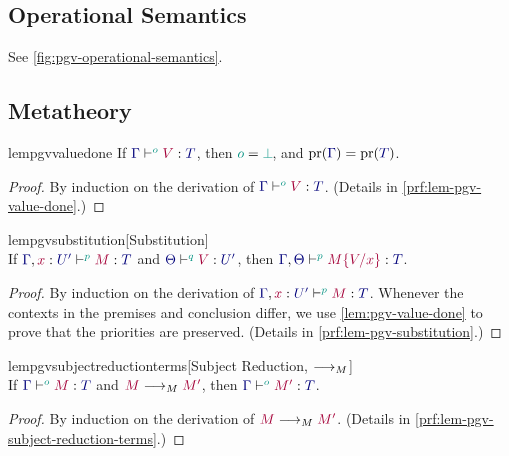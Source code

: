 \documentclass[main.tex]{subfiles}
\begin{document}
\subsection{Operational Semantics}
See \cref{fig:pgv-operational-semantics}.


\subsection{Metatheory}

\begin{restatablelemma}{lempgvvaluedone}
  \label{lem:pgv-value-done}
  If $\tseq[\cs{o}]{\ty{\Gamma}}{V}{T}$, then $\cs{o}=\cs{\pbot}$, and $\pr(\ty{\Gamma})=\pr(\ty{T})$.
\end{restatablelemma}
\begin{proof}
  By induction on the derivation of $\tseq[\cs{o}]{\ty{\Gamma}}{V}{T}$.
  (Details in \cref{prf:lem-pgv-value-done}.)
\end{proof}

\begin{restatablelemma}{lempgvsubstitution}[Substitution]
  \label{lem:pgv-substitution}
  \hfill\\%
  If $\tseq[\cs{p}]{\ty{\Gamma},\tmty{x}{U'}}{M}{T}$ and $\tseq[\cs{q}]{\ty{\Theta}}{V}{U'}$, then $\tseq[\cs{p}]{\ty{\Gamma},\ty{\Theta}}{\subst{M}{V}{x}}{T}$.
\end{restatablelemma}
\begin{proof}
  By induction on the derivation of $\tseq[\cs{p}]{\ty{\Gamma},\tmty{x}{U'}}{M}{T}$. Whenever the contexts in the premises and conclusion differ, we use \cref{lem:pgv-value-done} to prove that the priorities are preserved.
  (Details in \cref{prf:lem-pgv-substitution}.)
\end{proof}

\begin{restatablelemma}{lempgvsubjectreductionterms}[Subject Reduction, $\longrightarrow_{M}$]
  \label{lem:pgv-subject-reduction-terms}
  \hfill\\%
  If $\tseq[\cs{o}]{\ty{\Gamma}}{M}{T}$ and $\tm{M}\tred\tm{M'}$,
  then $\tseq[\cs{o}]{\ty{\Gamma}}{M'}{T}$.
\end{restatablelemma}
\begin{proof}
  By induction on the derivation of $\tm{M}\tred\tm{M'}$.
  (Details in \cref{prf:lem-pgv-subject-reduction-terms}.)
\end{proof}
\end{document}
